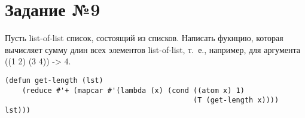 \section{Задание №9}

Пусть list-of-list список, состоящий из списков. Написать фукнцию, которая
вычисляет сумму длин всех элементов list-of-list, т.~е., например, для
аргумента ((1 2) (3 4)) -> 4.

\vspace{4mm}
\begin{minipage}{0.92\linewidth}
\begin{lstlisting}
(defun get-length (lst)
    (reduce #'+ (mapcar #'(lambda (x) (cond ((atom x) 1)
                                            (T (get-length x)))) lst)))
\end{lstlisting}
\end{minipage}

